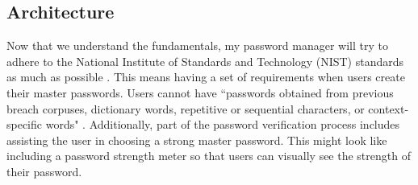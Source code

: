 \documentclass[10pt,twocolumn]{article}
\begin{document}
\subsection{Architecture}
Now that we understand the fundamentals, my password manager will try to adhere to the National Institute of Standards and Technology (NIST) standards as much as possible \cite{grassi_fenton_newton_perlner_regenscheid_burr_richer}. This means having a set of requirements when users create their master passwords. Users cannot have ``passwords obtained from previous breach corpuses, dictionary words, repetitive or sequential characters, or context-specific words" \cite{grassi_fenton_newton_perlner_regenscheid_burr_richer}. Additionally, part of the password verification process includes assisting the user in choosing a strong master password. This might look like including a password strength meter so that users can visually see the strength of their password.
\end{document}
